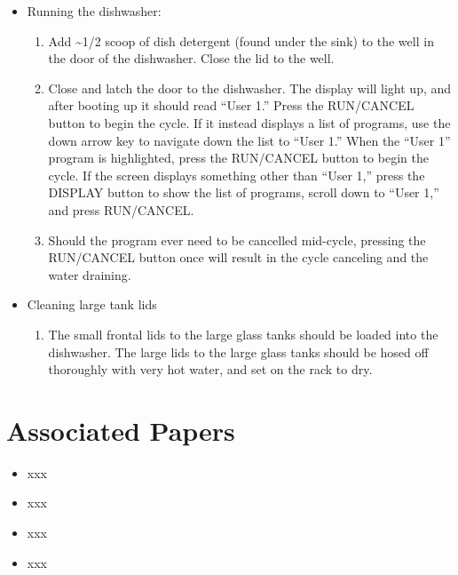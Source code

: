 \documentclass[
  letterpaper,
  DIV=11,
  numbers=noendperiod]{scrreprt}
\providecommand{\tightlist}{%
  \setlength{\itemsep}{0pt}\setlength{\parskip}{0pt}}\usepackage{longtable,booktabs,array}
\begin{document}
\begin{itemize}
\tightlist
\item
  Running the dishwasher:

  \begin{enumerate}
  \def\labelenumi{\arabic{enumi}.}
  \tightlist
  \item
    Add \textasciitilde1/2 scoop of dish detergent (found under the
    sink) to the well in the door of the dishwasher. Close the lid to
    the well.
  \item
    Close and latch the door to the dishwasher. The display will light
    up, and after booting up it should read ``User 1.'' Press the
    RUN/CANCEL button to begin the cycle. If it instead displays a list
    of programs, use the down arrow key to navigate down the list to
    ``User 1.'' When the ``User 1'' program is highlighted, press the
    RUN/CANCEL button to begin the cycle. If the screen displays
    something other than ``User 1,'' press the DISPLAY button to show
    the list of programs, scroll down to ``User 1,'' and press
    RUN/CANCEL.
  \item
    Should the program ever need to be cancelled mid-cycle, pressing the
    RUN/CANCEL button once will result in the cycle canceling and the
    water draining.
  \end{enumerate}
\item
  Cleaning large tank lids

  \begin{enumerate}
  \def\labelenumi{\arabic{enumi}.}
  \tightlist
  \item
    The small frontal lids to the large glass tanks should be loaded
    into the dishwasher. The large lids to the large glass tanks should
    be hosed off thoroughly with very hot water, and set on the rack to
    dry.
  \end{enumerate}
\end{itemize}

\hypertarget{associated-papers-27}{%
\section{Associated Papers}\label{associated-papers-27}}

\begin{itemize}
\tightlist
\item
  xxx
\item
  xxx
\item
  xxx
\item
  xxx
\end{itemize}
\end{document}

